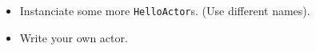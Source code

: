\begin{frame}
\begin{itemize}
\item Instanciate some more \lstinline!HelloActor!s. (Use different names).
\item Write your own actor.
\end{itemize}
\end{frame}
